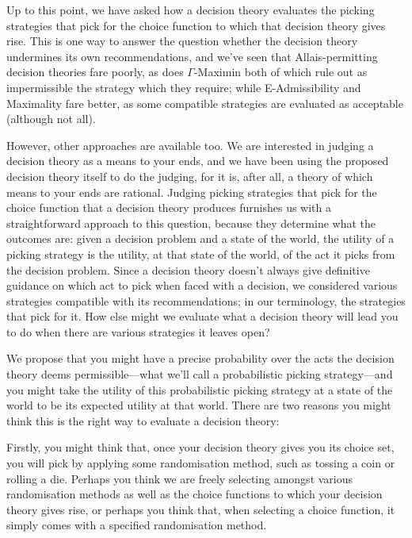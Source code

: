 \documentclass[a4paper]{article}
\newcommand{\todoold}[2][]{\todo[backgroundcolor=white,bordercolor=orange!10,linecolor=gray!10, #1,caption={},textcolor=gray]{Pre-rev: #2}}
\newcommand{\todooldinfo}[2][]{\todoold[#1]{#2}}
\newenvironment{CCM rewritten}
{\begingroup\color{blue}} %
{\endgroup}              %
\begin{document}
Up to this point, we have asked how a decision theory evaluates the picking strategies that pick for the choice function to which that decision theory gives rise. This is one way to answer the question whether the decision theory undermines its own recommendations, and we've seen that Allais-permitting decision theories fare poorly, as does $\Gamma$-Maximin both of which rule out as impermissible the strategy which they require; while E-Admissibility and Maximality fare better, as some compatible strategies are evaluated as acceptable (although not all). \todoold{check that}

However, other approaches are available too. We are interested in judging a decision theory as a means to your ends, and we have been using the proposed decision theory itself to do the judging, for it is, after all, a theory of which means to your ends are rational. Judging picking strategies that pick for the choice function that a decision theory produces furnishes us with a straightforward approach to this question, because they determine what the outcomes are: given a decision problem and a state of the world, the utility of a picking strategy is the utility, at that state of the world, of the act it picks from the decision problem. Since a decision theory doesn't always give definitive guidance on which act to pick when faced with a decision, we considered various strategies compatible with its recommendations; in our terminology, the strategies that pick for it. 
How else might we evaluate what a decision theory will lead you to do when there are various strategies %
it leaves open?

We propose that you might have a precise probability over the acts the decision theory deems permissible---what we'll call a probabilistic picking strategy---and you might take the utility of this probabilistic picking strategy at a state of the world to be its expected utility at that world. There are two reasons you might think this is the right way to evaluate a decision theory: 

Firstly, you might think that, once your decision theory gives you its choice set, you will pick by applying some randomisation method, such as tossing a coin or rolling a die. Perhaps you think we are freely selecting amongst various randomisation methods as well as the choice functions to which your decision theory gives rise, or perhaps you think that, when selecting a choice function, it simply comes with a specified randomisation method. %
\end{document}

